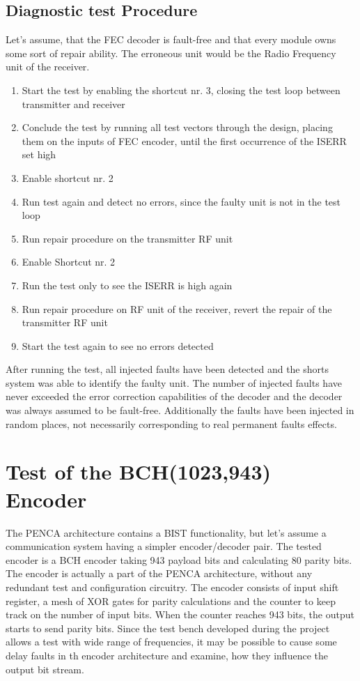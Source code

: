 \subsection{Diagnostic test Procedure}
Let's assume, that the FEC decoder is fault-free and that every module owns some sort of repair ability. The erroneous unit would be the Radio Frequency unit of the receiver.
\begin{enumerate}
    \item Start the test by enabling the shortcut nr. 3, closing the test loop between transmitter and receiver
    \item Conclude the test by running all test vectors through the design, placing them on the inputs of FEC encoder, until the first occurrence of the ISERR set high
    \item Enable shortcut nr. 2
    \item Run test again and detect no errors, since the faulty unit is not in the test loop
    \item Run repair procedure on the transmitter RF unit
    \item Enable Shortcut nr. 2
    \item Run the test only to see the ISERR is high again
    \item Run repair procedure on RF unit of the receiver, revert the repair of the transmitter RF unit
    \item Start the test again to see no errors detected
\end{enumerate}

After running the test, all injected faults have been detected and the shorts system was able to identify the faulty unit. The number of injected faults have never exceeded the error correction capabilities of the decoder and the decoder was always assumed to be fault-free. Additionally the faults have been injected in random places, not necessarily corresponding to real permanent faults effects.

\section{Test of the BCH(1023,943) Encoder}
The PENCA architecture contains a BIST functionality, but let's assume a communication system having a simpler encoder/decoder pair. The tested encoder is a BCH encoder taking 943 payload bits and calculating 80 parity bits. The encoder is actually a part of the PENCA architecture, without any redundant test and configuration circuitry. The encoder consists of input shift register, a mesh of XOR gates for parity calculations and the counter to keep track on the number of input bits. When the counter reaches 943 bits, the output starts to send parity bits. Since the test bench developed during the project allows a test with wide range of frequencies, it may be possible to cause some delay faults in th encoder architecture and examine, how they influence the output bit stream. 

